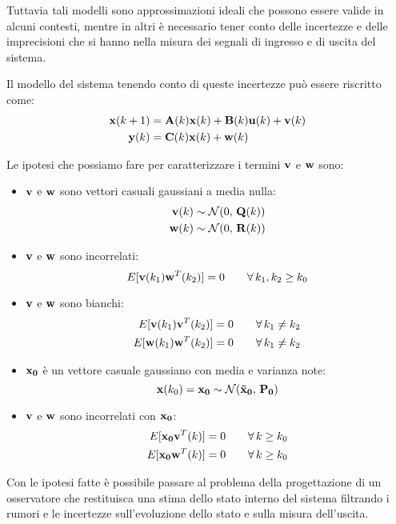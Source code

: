 Tuttavia tali modelli sono approssimazioni ideali che possono essere valide in alcuni contesti, mentre in altri è necessario tener conto delle incertezze e delle imprecisioni che si hanno nella misura dei segnali di ingresso e di uscita del sistema.

Il modello del sistema tenendo conto di queste incertezze può essere riscritto come:
\begin{align*}
\mathbf{x}(k+1) &= \mathbf{A}(k)\mathbf{x}(k) + \mathbf{B}(k)\mathbf{u}(k) + \mathbf{v}(k) \\
\mathbf{y}(k) &= \mathbf{C}(k)\mathbf{x}(k) + \mathbf{w}(k)
\end{align*}

\noindent Le ipotesi che possiamo fare per caratterizzare i termini $\mathbf{v}$ e $\mathbf{w}$ sono:
\begin{itemize}
\item $\mathbf{v}$ e $\mathbf{w}$ sono vettori casuali gaussiani a media nulla: 
\begin{align*}
 \mathbf{v}(k) &\sim \mathcal{N}(0,\,\mathbf{Q}(k)) \\
 \mathbf{w}(k) &\sim \mathcal{N}(0,\,\mathbf{R}(k))
\end{align*}
\item $\mathbf{v}$ e $\mathbf{w}$ sono incorrelati:
 \[E[\mathbf{v}(k_1)\mathbf{w}^T(k_2)]=0\qquad \forall\, k_1,k_2 \geq k_0\]
\item $\mathbf{v}$ e $\mathbf{w}$ sono bianchi: 
\begin{align*}
 E[\mathbf{v}(k_1)\mathbf{v}^T(k_2)]&=0\qquad \forall\, k_1 \neq k_2 \\
 E[\mathbf{w}(k_1)\mathbf{w}^T(k_2)]&=0\qquad \forall\, k_1 \neq k_2
\end{align*}
\item $\mathbf{x_0}$ è un vettore casuale gaussiano con media e varianza note:
\[\mathbf{x}(k_0)=\mathbf{x_0} \sim \mathcal{N}(\mathbf{\bar{x}_0},\,\mathbf{P_0})\]
\item $\mathbf{v}$ e $\mathbf{w}$ sono incorrelati con $\mathbf{x_0}$:
\begin{align*}
 E[\mathbf{x_0}\mathbf{v}^T(k)]&=0\qquad \forall\, k \geq k_0 \\
 E[\mathbf{x_0}\mathbf{w}^T(k)]&=0\qquad \forall\, k \geq k_0
\end{align*}
\end{itemize}

Con le ipotesi fatte è possibile passare al problema della progettazione di un osservatore che restituisca una stima dello stato interno del sistema filtrando i rumori e le incertezze sull'evoluzione dello stato e sulla misura dell'uscita.